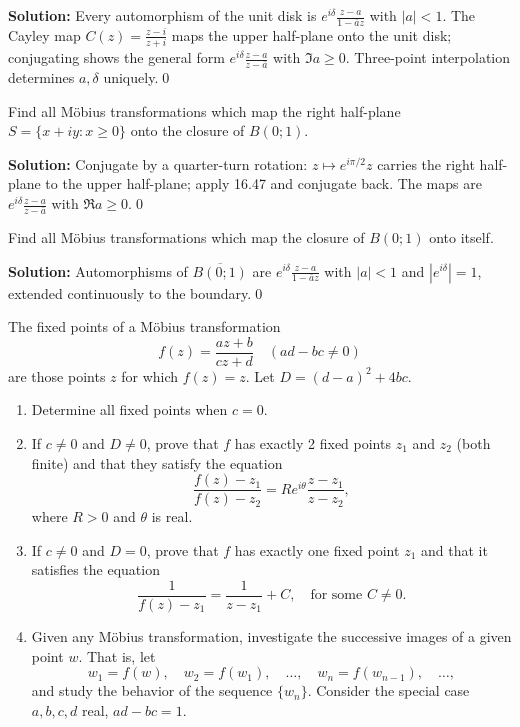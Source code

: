\noindent\textbf{Solution:}
Every automorphism of the unit disk is $e^{i\delta}\frac{z-a}{1-\bar a z}$ with $|a|<1$. The Cayley map $C(z)=\frac{z-i}{z+i}$ maps the upper half-plane onto the unit disk; conjugating shows the general form $e^{i\delta}\frac{z-a}{z-\bar a}$ with $\Im a\ge0$. Three-point interpolation determines $a,\delta$ uniquely.\qed


\begin{problembox}
Find all Möbius transformations which map the right half-plane \( S = \{ x + i y : x \geq 0 \} \) onto the closure of \( B(0; 1) \).
\end{problembox}

\noindent\textbf{Solution:}
Conjugate by a quarter-turn rotation: $z\mapsto e^{i\pi/2}z$ carries the right half-plane to the upper half-plane; apply 16.47 and conjugate back. The maps are $e^{i\delta}\frac{z-a}{z-\bar a}$ with $\Re a\ge0$.\qed


\begin{problembox}
Find all Möbius transformations which map the closure of \( B(0; 1) \) onto itself.
\end{problembox}

\noindent\textbf{Solution:}
Automorphisms of $\overline{B(0;1)}$ are $e^{i\delta}\frac{z-a}{1-\bar a z}$ with $|a|<1$ and $|e^{i\delta}|=1$, extended continuously to the boundary.\qed


\begin{problembox}
The fixed points of a Möbius transformation
\[ f(z) = \frac{a z + b}{c z + d} \quad (ad - bc \neq 0) \]
are those points \( z \) for which \( f(z) = z \). Let \( D = (d - a)^2 + 4bc \).
\begin{enumerate}[label=(\alph*)]
\item Determine all fixed points when \( c = 0 \).
\item If \( c \neq 0 \) and \( D \neq 0 \), prove that \( f \) has exactly 2 fixed points \( z_1 \) and \( z_2 \) (both finite) and that they satisfy the equation
\[ \frac{f(z) - z_1}{f(z) - z_2} = R e^{i \theta} \frac{z - z_1}{z - z_2}, \]
where \( R > 0 \) and \( \theta \) is real.
\item If \( c \neq 0 \) and \( D = 0 \), prove that \( f \) has exactly one fixed point \( z_1 \) and that it satisfies the equation
\[ \frac{1}{f(z) - z_1} = \frac{1}{z - z_1} + C, \quad \text{for some } C \neq 0. \]
\item Given any Möbius transformation, investigate the successive images of a given point \( w \). That is, let
\[ w_1 = f(w), \quad w_2 = f(w_1), \quad \ldots, \quad w_n = f(w_{n-1}), \quad \ldots, \]
and study the behavior of the sequence \( \{ w_n \} \). Consider the special case \( a, b, c, d \) real, \( ad - bc = 1 \).
\end{enumerate}
\end{problembox}

